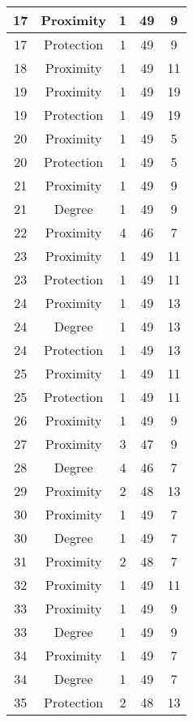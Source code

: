 \documentclass[results.tex]{subfiles}
\begin{document}
\begin{center}
\begin{tabular}{| c || c | c | c | c |}
    \hline
    17 & Proximity & 1 & 49 & 9 \\ 
    \hline
    17 & Protection & 1 & 49 & 9 \\ 
    \hline
    18 & Proximity & 1 & 49 & 11 \\ 
    \hline
    19 & Proximity & 1 & 49 & 19 \\ 
    \hline
    19 & Protection & 1 & 49 & 19 \\ 
    \hline
    20 & Proximity & 1 & 49 & 5 \\ 
    \hline
    20 & Protection & 1 & 49 & 5 \\ 
    \hline
    21 & Proximity & 1 & 49 & 9 \\ 
    \hline
    21 & Degree & 1 & 49 & 9 \\ 
    \hline
    22 & Proximity & 4 & 46 & 7 \\ 
    \hline
    23 & Proximity & 1 & 49 & 11 \\ 
    \hline
    23 & Protection & 1 & 49 & 11 \\ 
    \hline
    24 & Proximity & 1 & 49 & 13 \\ 
    \hline
    24 & Degree & 1 & 49 & 13 \\ 
    \hline
    24 & Protection & 1 & 49 & 13 \\ 
    \hline
    25 & Proximity & 1 & 49 & 11 \\ 
    \hline
    25 & Protection & 1 & 49 & 11 \\ 
    \hline
    26 & Proximity & 1 & 49 & 9 \\ 
    \hline
    27 & Proximity & 3 & 47 & 9 \\ 
    \hline
    28 & Degree & 4 & 46 & 7 \\ 
    \hline
    29 & Proximity & 2 & 48 & 13 \\ 
    \hline
    30 & Proximity & 1 & 49 & 7 \\ 
    \hline
    30 & Degree & 1 & 49 & 7 \\ 
    \hline
    31 & Proximity & 2 & 48 & 7 \\ 
    \hline
    32 & Proximity & 1 & 49 & 11 \\ 
    \hline
    33 & Proximity & 1 & 49 & 9 \\ 
    \hline
    33 & Degree & 1 & 49 & 9 \\ 
    \hline
    34 & Proximity & 1 & 49 & 7 \\ 
    \hline
    34 & Degree & 1 & 49 & 7 \\ 
    \hline
    35 & Protection & 2 & 48 & 13 \\ 

\end{tabular}
\end{center}
\end{document}
